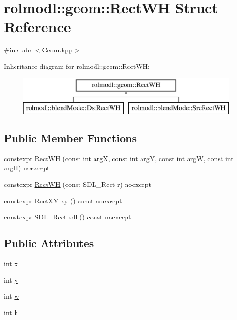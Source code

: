 \hypertarget{structrolmodl_1_1geom_1_1_rect_w_h}{}\section{rolmodl\+::geom\+::Rect\+WH Struct Reference}
\label{structrolmodl_1_1geom_1_1_rect_w_h}


{\ttfamily \#include $<$Geom.\+hpp$>$}

Inheritance diagram for rolmodl\+::geom\+::Rect\+WH\+:\begin{figure}[H]
\begin{center}
\leavevmode
\includegraphics[height=2.000000cm]{structrolmodl_1_1geom_1_1_rect_w_h}
\end{center}
\end{figure}
\subsection*{Public Member Functions}
\begin{DoxyCompactItemize}
\item 
constexpr \mbox{\hyperlink{structrolmodl_1_1geom_1_1_rect_w_h_a1caf46da21836b3a091eb404f89f17b3}{Rect\+WH}} (const int argX, const int argY, const int argW, const int argH) noexcept
\item 
constexpr \mbox{\hyperlink{structrolmodl_1_1geom_1_1_rect_w_h_aa54ac63c91765fa089da14ff41346d0d}{Rect\+WH}} (const S\+D\+L\+\_\+\+Rect r) noexcept
\item 
constexpr \mbox{\hyperlink{structrolmodl_1_1geom_1_1_rect_x_y}{Rect\+XY}} \mbox{\hyperlink{structrolmodl_1_1geom_1_1_rect_w_h_aa4f1d9f3ff2d3f082f0c53ddf193f502}{xy}} () const noexcept
\item 
constexpr S\+D\+L\+\_\+\+Rect \mbox{\hyperlink{structrolmodl_1_1geom_1_1_rect_w_h_a9bd269b0d7d081baf77de37b80c0c59a}{sdl}} () const noexcept
\end{DoxyCompactItemize}
\subsection*{Public Attributes}
\begin{DoxyCompactItemize}
\item 
int \mbox{\hyperlink{structrolmodl_1_1geom_1_1_rect_w_h_a3f7a0a045ddd53a3546ea63fc167d5a0}{x}}
\item 
int \mbox{\hyperlink{structrolmodl_1_1geom_1_1_rect_w_h_a26a6551209bbfacc69a4a2c56f2085a5}{y}}
\item 
int \mbox{\hyperlink{structrolmodl_1_1geom_1_1_rect_w_h_ab2e025f1f2917ba1573b28cfb94b43a2}{w}}
\item 
int \mbox{\hyperlink{structrolmodl_1_1geom_1_1_rect_w_h_ab657f01f57146900006eaf55e66bf304}{h}}
\end{DoxyCompactItemize}



